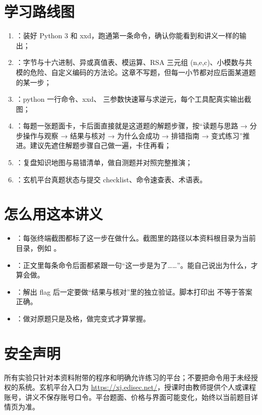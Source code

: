 \documentclass[UTF8,12pt,oneside]{ctexbook}
\begin{document}
\section*{学习路线图}
\begin{enumerate}
\item {}：装好 Python 3 和 xxd，跑通第一条命令，确认你能看到和讲义一样的输出；
\item {}：字节与十六进制、异或真值表、模运算、RSA 三元组 (n,e,c)、小模数与共模的危险、自定义编码的方法论。这章不写题，但每一小节都对应后面某道题的某一步；
\item {}：python 一行命令、xxd、 三参数快速幂与求逆元，每个工具配真实输出截图；
\item {}：每题一张题面卡，卡后面直接就是这道题的解题步骤，按“读题与思路 → 分步操作与观察 → 结果与核对 → 为什么会成功 → 排错指南 → 变式练习”推进。建议先遮住解题步骤自己做一遍，卡住再看；
\item {}：复盘知识地图与易错清单，做自测题并对照完整推演；
\item {}：玄机平台真题状态与提交 checklist、命令速查表、术语表。
\end{enumerate}

\section*{怎么用这本讲义}
\begin{itemize}
\item {}：每张终端截图都标了这一步在做什么。截图里的路径以本资料根目录为当前目录，例如 。
\item {}：正文里每条命令后面都紧跟一句“这一步是为了……”。能自己说出为什么，才算会做。
\item {}：解出 flag 后一定要做“结果与核对”里的独立验证。脚本打印出  不等于答案正确。
\item {}：做对原题只是及格，做完变式才算掌握。
\end{itemize}

\section*{安全声明}
所有实验只针对本资料附带的程序和明确允许练习的平台；不要把命令用于未经授权的系统。玄机平台入口为 \url{https://xj.edisec.net/}，授课时由教师提供个人或课程账号，讲义不保存账号口令。平台题面、价格与界面可能变化，始终以当前题目详情页为准。
\end{document}
